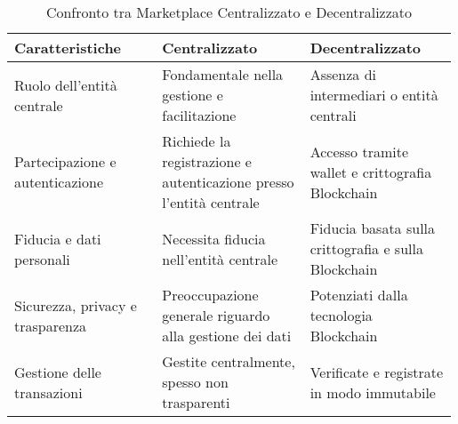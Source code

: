 \begin{table}[H]
    \centering
    \renewcommand{\arraystretch}{1.5}
    \begin{adjustbox}{max width=1\textwidth}
        \begin{tabular}{| p{0.33\linewidth} | p{0.33\linewidth} | p{0.33\linewidth} |}
            \hline
            \rowcolor{mint-cream}
            Caratteristiche                  & Centralizzato                                                       & Decentralizzato                                      \\
            \hline
            Ruolo dell'entità centrale       & Fondamentale nella gestione e facilitazione                         & Assenza di intermediari o entità centrali            \\
            \hline
            Partecipazione e autenticazione  & Richiede la registrazione e autenticazione presso l'entità centrale & Accesso tramite wallet e crittografia Blockchain     \\
            \hline
            Fiducia e dati personali         & Necessita fiducia nell'entità centrale                              & Fiducia basata sulla crittografia e sulla Blockchain \\
            \hline
            Sicurezza, privacy e trasparenza & Preoccupazione generale riguardo alla gestione dei dati             & Potenziati dalla tecnologia Blockchain               \\
            \hline
            Gestione delle transazioni       & Gestite centralmente, spesso non trasparenti                        & Verificate e registrate in modo immutabile          \\
            \hline
        \end{tabular}
    \end{adjustbox}
    \caption{Confronto tra Marketplace Centralizzato e Decentralizzato}
    \label{table:confronto-marketplace}
\end{table}
